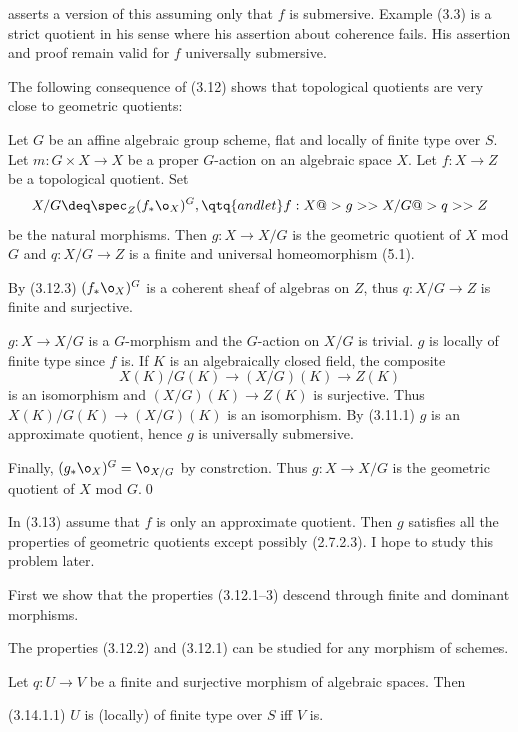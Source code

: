  \cite{Fogarty83} asserts a version of this assuming only
that  $f$ is submersive. Example (3.3) is a strict quotient in his sense
where his assertion about coherence fails. His assertion and proof remain
valid for $f$ universally submersive.
\enddemo



The following   consequence of (3.12)  shows that topological quotients
are very close to geometric quotients:

 Let $G$ be an affine algebraic group scheme,
flat and locally of finite type over $S$. Let $m:G\times X\to X$
be a proper $G$-action on an algebraic space $X$.
 Let  $f:X\to Z$ be a topological quotient.
Set
$$
X/G\deq \spec_Z(f_*\o_X)^G,\qtq{and let }f:X@>g>> X/G@>q>> Z
$$
be the natural morphisms.
Then $g:X\to  X/G$ is the geometric quotient of $X$ mod
$G$ and $q:X/G\to Z$ is a finite and universal homeomorphism (5.1).
\endproclaim

\demop By (3.12.3) $(f_*\o_X)^G$ is a coherent sheaf of algebras on $Z$,
thus $q:X/G\to Z$ is finite and surjective.

$g:X\to X/G$ is a $G$-morphism and the $G$-action on $X/G$ is trivial. $g$ is
locally of finite type since  $f$ is.
If $K$ is an algebraically closed field,   the composite
$$
X(K)/G(K)\to (X/G)(K)\to Z(K)
$$
is an isomorphism and $(X/G)(K)\to Z(K)$ is surjective. Thus
$X(K)/G(K)\to (X/G)(K)$ is an isomorphism.
By (3.11.1) $g$ is an approximate quotient, hence $g$ is universally
submersive.

Finally, $(g_*\o_X)^G=\o_{X/G}$ by constrction. Thus $g:X\to X/G$ is
the geometric quotient of $X$ mod
$G$.\qed\enddemo


 In (3.13)  assume that $f$ is only an approximate
quotient. Then $g$ satisfies all the properties of geometric quotients except
possibly (2.7.2.3). I hope to study this problem later.
\enddemo




    First we show that
the properties (3.12.1--3) descend through finite and dominant morphisms.

The properties (3.12.2) and (3.12.1) can be studied for any morphism of
schemes.

 \cite{Atiyah-MacDonald69, 7.8; EGA71, 0.6.4.9} Let
$q:U\to V$ be a finite and surjective morphism of algebraic spaces. Then

(3.14.1.1) $U$
is (locally) of finite type over
$S$ iff $V$ is.

